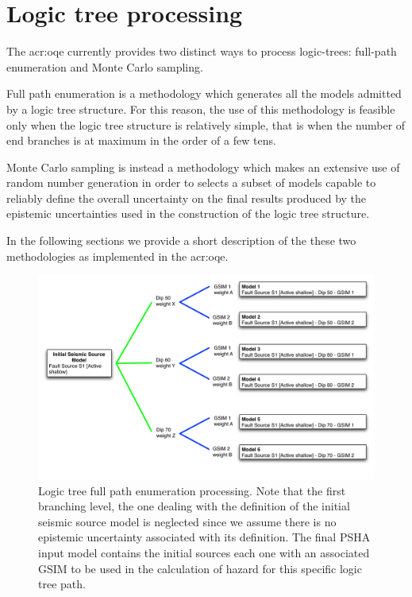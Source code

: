 \section{Logic tree processing}
The \gls{acr:oqe} currently provides two distinct ways to process 
logic-trees: full-path enumeration and Monte Carlo sampling. 

Full path enumeration is a methodology which generates all the 
models admitted by a logic tree structure. 
%
For this reason, the use of this methodology is feasible only when 
the logic tree structure is relatively simple, that is when the number 
of end branches is at maximum in the order of a few tens.

Monte Carlo sampling is instead a methodology which makes an extensive 
use of random number generation in order to selects a subset of models 
capable to reliably define the overall uncertainty on the final results 
produced by the epistemic uncertainties used in the construction of the 
logic tree structure. 

In the following sections we provide a short description of 
the these two methodologies as implemented in the \gls{acr:oqe}.
%
\begin{figure}[ht]
\centering
\includegraphics[width=\textwidth]{./Pictures/lts/logic_tree_ex1.pdf}
\caption{Logic tree full path enumeration processing. Note that the
first branching level, the one dealing with the definition of the initial 
seismic source model is neglected since we assume there is no epistemic
uncertainty associated with its definition. The final PSHA input model 
contains the initial sources each one with an associated GSIM to be used 
in the calculation of hazard for this specific logic tree path.}
\label{fig:logic_tree_example1}
\end{figure}
%

